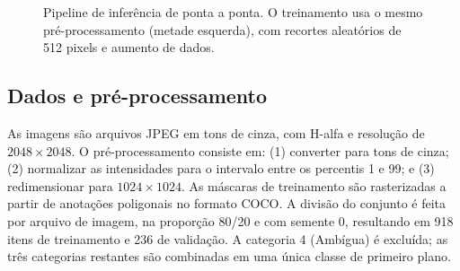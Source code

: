 \documentclass[
  article,
  11pt,
  oneside,
  a4paper,
  english,
  brazil,
  sumario=tradicional
]{abntex2}
\begin{document}
\begin{figure}[htbp]
\centering
{}
\caption{Pipeline de inferência de ponta a ponta. O treinamento usa o mesmo pré-processamento (metade esquerda), com recortes aleatórios de 512 pixels e aumento de dados.}
\label{fig:pipeline}
\par{}
\end{figure}

\subsection{Dados e pré-processamento}

As imagens são arquivos JPEG em tons de cinza, com H-alfa e resolução de $2048\times2048$. O pré-processamento consiste em: (1) converter para tons de cinza; (2) normalizar as intensidades para o intervalo entre os percentis 1 e 99; e (3) redimensionar para $1024\times1024$. As máscaras de treinamento são rasterizadas a partir de anotações poligonais no formato COCO. A divisão do conjunto é feita por arquivo de imagem, na proporção 80/20 e com semente 0, resultando em 918 itens de treinamento e 236 de validação. A categoria 4 (Ambígua) é excluída; as três categorias restantes são combinadas em uma única classe de primeiro plano.
\end{document}
